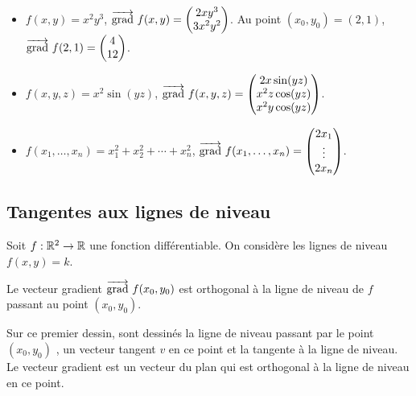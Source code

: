 \begin{exemple}{}{}
	\begin{itemize}
		\item $f(x,y) = x^2y^3$, $\overrightarrow{\textup{grad}}\  f (x,y) =  \begin{pmatrix}2xy^3\\3x^2y^2\end{pmatrix}$. Au point $(x_0,y_0)=(2,1)$, $\overrightarrow{\textup{grad}}\  f (2,1) =  \begin{pmatrix}4\\12\end{pmatrix}$.
		
		\item $f(x,y,z) = x^2\sin(yz)$, $\overrightarrow{\textup{grad}}\  f (x,y,z) = \begin{pmatrix} 2x\sin(yz) \\ x^2z \cos(yz) \\ x^2y\cos(yz) \end{pmatrix}$.
		
		\item $f(x_1,\ldots,x_n)= x_1^2+x_2^2+\cdots + x_n^2$, $\overrightarrow{\textup{grad}}\  f (x_1,\ldots,x_n) =  \begin{pmatrix}2x_1\\ \vdots \\2x_n\end{pmatrix}$.
	\end{itemize}
\end{exemple}



\subsection{Tangentes aux lignes de niveau}


Soit $f : \mathbb{R}^2 \to \mathbb{R}$ une fonction différentiable. On considère les lignes de niveau $f(x,y)=k$.


\begin{proposition}{}{}
	Le vecteur gradient $\overrightarrow{\textup{grad}}\  f(x_0,y_0)$ est orthogonal à la ligne de niveau de $f$ passant au point $(x_0,y_0)$. 
\end{proposition}


Sur ce premier dessin, sont dessinés la ligne de niveau passant par le point $(x_0,y_0)$ , un vecteur tangent $v$ en ce point et la tangente à la ligne de niveau. 
Le vecteur gradient est un vecteur du plan qui est orthogonal à la ligne de niveau en ce point.



